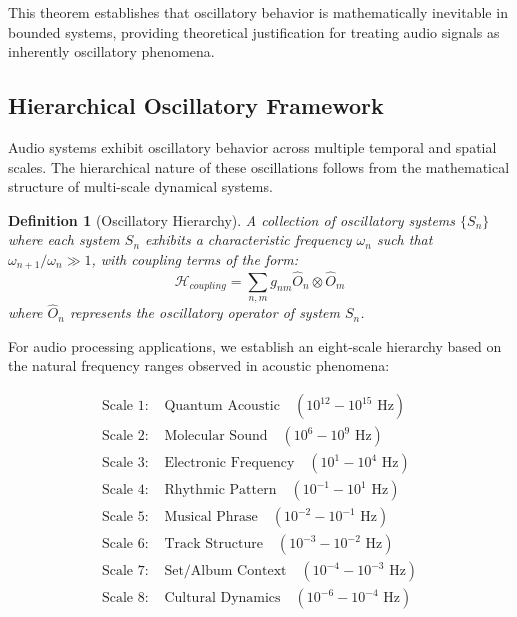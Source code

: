 \documentclass[12pt,a4paper]{article}
\newtheorem{definition}{Definition}
\begin{document}
This theorem establishes that oscillatory behavior is mathematically inevitable in bounded systems, providing theoretical justification for treating audio signals as inherently oscillatory phenomena.

\subsection{Hierarchical Oscillatory Framework}

Audio systems exhibit oscillatory behavior across multiple temporal and spatial scales. The hierarchical nature of these oscillations follows from the mathematical structure of multi-scale dynamical systems.

\begin{definition}[Oscillatory Hierarchy]
A collection of oscillatory systems $\{S_n\}$ where each system $S_n$ exhibits a characteristic frequency $\omega_n$ such that $\omega_{n+1}/\omega_n \gg 1$, with coupling terms of the form:
\begin{equation}
\mathcal{H}_{coupling} = \sum_{n,m} g_{nm} \hat{O}_n \otimes \hat{O}_m
\end{equation}
where $\hat{O}_n$ represents the oscillatory operator of system $S_n$.
\end{definition}

For audio processing applications, we establish an eight-scale hierarchy based on the natural frequency ranges observed in acoustic phenomena:

\begin{align}
\text{Scale 1: } &\text{Quantum Acoustic} \quad (10^{12}-10^{15} \text{ Hz}) \label{eq:scale1} \\
\text{Scale 2: } &\text{Molecular Sound} \quad (10^6-10^9 \text{ Hz}) \label{eq:scale2} \\
\text{Scale 3: } &\text{Electronic Frequency} \quad (10^1-10^4 \text{ Hz}) \label{eq:scale3} \\
\text{Scale 4: } &\text{Rhythmic Pattern} \quad (10^{-1}-10^1 \text{ Hz}) \label{eq:scale4} \\
\text{Scale 5: } &\text{Musical Phrase} \quad (10^{-2}-10^{-1} \text{ Hz}) \label{eq:scale5} \\
\text{Scale 6: } &\text{Track Structure} \quad (10^{-3}-10^{-2} \text{ Hz}) \label{eq:scale6} \\
\text{Scale 7: } &\text{Set/Album Context} \quad (10^{-4}-10^{-3} \text{ Hz}) \label{eq:scale7} \\
\text{Scale 8: } &\text{Cultural Dynamics} \quad (10^{-6}-10^{-4} \text{ Hz}) \label{eq:scale8}
\end{align}
\end{document}
